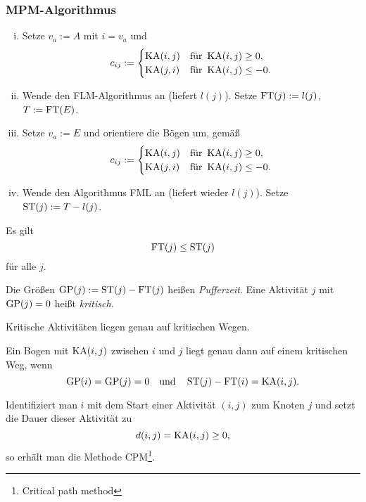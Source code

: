 \subsubsection*{MPM-Algorithmus}
\begin{enumerate}[(i)]
\item Setze $v_a := A$ mit $i = v_a$ und
  \[ c_{ij} := \begin{cases}
      \operatorname*{KA}(i,j) &\text{für } \operatorname*{KA}(i,j) \ge 0, \\
      \operatorname*{KA}(j,i) &\text{für } \operatorname*{KA}(i,j) \le - 0. \\
    \end{cases}
  \]
\item Wende den FLM-Algorithmus an (liefert $l(j)$). Setze $\operatorname*{FT}(j) := l(j)$,
  $T := \operatorname*{FT}(E)$.
\item Setze $v_a := E$ und orientiere die Bögen um, gemäß
  \[ c_{ij} := \begin{cases}
      \operatorname*{KA}(i,j) &\text{für } \operatorname*{KA}(i,j) \ge 0, \\
      \operatorname*{KA}(j,i) &\text{für } \operatorname*{KA}(i,j) \le - 0. \\
    \end{cases}
  \]
\item Wende den Algorithmus FML an (liefert wieder $l(j)$). Setze $\operatorname*{ST}(j) := T -
  l(j)$.
\end{enumerate}

\begin{lem}
  Es gilt
  \[ \operatorname*{FT}(j) \le \operatorname*{ST}(j) \]
  für alle $j$.
\end{lem}

Die Größen $\operatorname*{GP}(j) := \operatorname*{ST}(j) - \operatorname*{FT}(j)$ heißen \emph{Pufferzeit}. Eine Aktivität
$j$ mit $\operatorname*{GP}(j) = 0$ heißt \emph{kritisch}.

\begin{aus}
  Kritische Aktivitäten liegen genau auf kritischen Wegen.
\end{aus}

\begin{aus}
  Ein Bogen mit $\operatorname*{KA}(i,j)$ zwischen $i$ und $j$ liegt genau dann auf einem
  kritischen Weg, wenn
  \[ \operatorname*{GP}(i) = \operatorname*{GP}(j) = 0 \quad \text{und} \quad \operatorname*{ST}(j) - \operatorname*{FT}(i) = \operatorname*{KA}(i,j). \]
\end{aus}

\begin{rmrk*}
  Identifiziert man $i$ mit dem Start einer Aktivität $(i,j)$ zum Knoten $j$ und
  setzt die Dauer dieser Aktivität zu
  \[ d(i,j) = \operatorname*{KA}(i,j) \ge 0, \]
  so erhält man die Methode CPM\footnote{Critical path method}.
\end{rmrk*}


